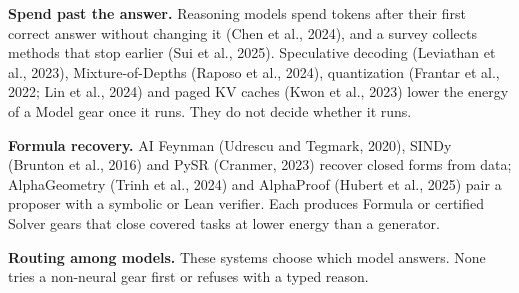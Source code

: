 \documentclass[
  10pt,
]{article}
\begin{document}
\textbf{Spend past the answer.} Reasoning models spend tokens after
their first correct answer without changing it (Chen et al., 2024), and
a survey collects methods that stop earlier (Sui et al., 2025).
Speculative decoding (Leviathan et al., 2023), Mixture-of-Depths (Raposo
et al., 2024), quantization (Frantar et al., 2022; Lin et al., 2024) and
paged KV caches (Kwon et al., 2023) lower the energy of a Model gear
once it runs. They do not decide whether it runs.

\textbf{Formula recovery.} AI Feynman (Udrescu and Tegmark, 2020), SINDy
(Brunton et al., 2016) and PySR (Cranmer, 2023) recover closed forms
from data; AlphaGeometry (Trinh et al., 2024) and AlphaProof (Hubert et
al., 2025) pair a proposer with a symbolic or Lean verifier. Each
produces Formula or certified Solver gears that close covered tasks at
lower energy than a generator.

\textbf{Routing among models.} These systems choose which model answers.
None tries a non-neural gear first or refuses with a typed reason.
\end{document}
